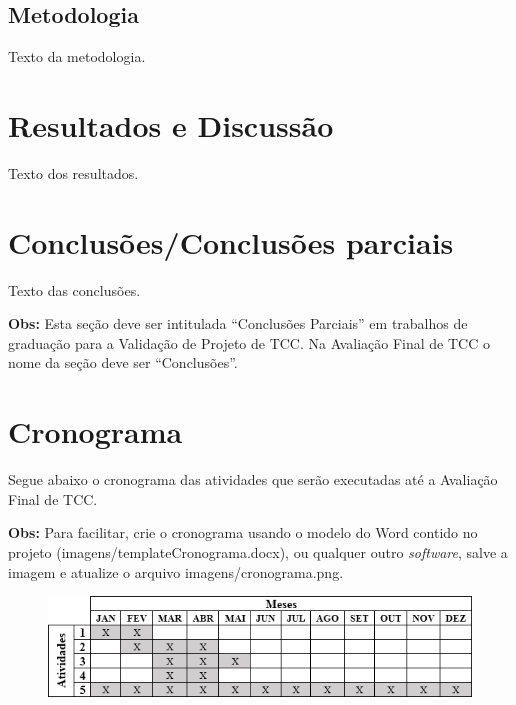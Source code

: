 \documentclass[
	article,
	11pt,
	oneside,
	a4paper,
	chapter=TITLE,
	section=TITLE,
	english,
	brazil,
	sumario=tradicional
]{abntex2}
\begin{document}
     
     
     
     \subsection{Metodologia}
     
     Texto da metodologia.
     
     
     
     
     

	\section{Resultados e Discussão}
    	
     Texto dos resultados.
     
     
     

	\section{Conclusões/Conclusões parciais}
	
	Texto das conclusões.
	
	\textbf{Obs:} Esta seção deve ser intitulada ``Conclusões Parciais'' em trabalhos de graduação para a Validação de Projeto de TCC. Na Avaliação Final de TCC o nome da seção deve ser ``Conclusões''.
    
    
    

	\section{Cronograma}
	
	Segue abaixo o cronograma das atividades que serão executadas até a Avaliação Final de TCC.
	
	\textbf{Obs:} Para facilitar, crie o cronograma usando o modelo do Word contido no projeto (imagens/templateCronograma.docx), ou qualquer outro \textit{software}, salve a imagem e atualize o arquivo imagens/cronograma.png.
	
	\FloatBarrier
	\begin{figure}[!htbp]
		\centering
		\includegraphics[scale=1]{imagens/cronograma}
	\end{figure}
	\FloatBarrier
	
\end{document}

